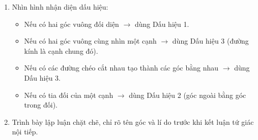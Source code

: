\begin{enumerate}
\item Nhìn hình nhận diện dấu hiệu:
\begin{itemize}
\item Nếu có hai góc vuông đối diện $\rightarrow$ dùng Dấu hiệu 1.
\item Nếu có hai góc vuông cùng nhìn một cạnh $\rightarrow$ dùng Dấu hiệu 3 (đường kính là cạnh chung đó).
\item Nếu có các đường chéo cắt nhau tạo thành các góc bằng nhau $\rightarrow$ dùng Dấu hiệu 3.
\item Nếu có tia đối của một cạnh $\rightarrow$ dùng Dấu hiệu 2 (góc ngoài bằng góc trong đối).
\end{itemize}
\item Trình bày lập luận chặt chẽ, chỉ rõ tên góc và lí do trước khi kết luận tứ giác nội tiếp.
\end{enumerate}
